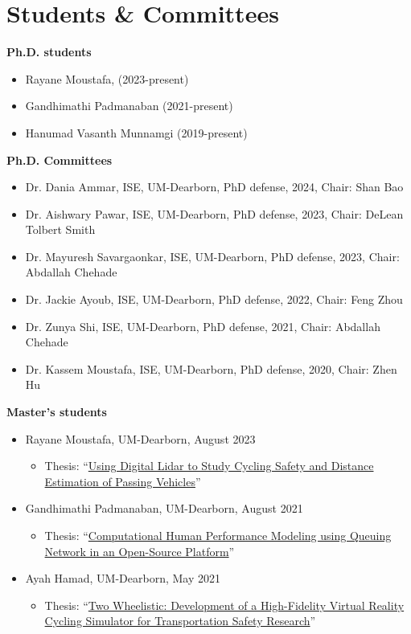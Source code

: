 \documentclass[11pt]{article}
\newenvironment{main}
{\begin{adjustwidth}{3em}{}}
{\end{adjustwidth}}
\begin{document}
\section*{Students \& Committees}
\begin{main}

\textbf{Ph.D. students}
\begin{itemize}
    \item Rayane Moustafa, (2023-present)
    \item Gandhimathi Padmanaban (2021-present)
    \item Hanumad Vasanth Munnamgi (2019-present)
\end{itemize}

\textbf{Ph.D. Committees}
\begin{itemize}
    \item Dr. Dania Ammar, ISE, UM-Dearborn, PhD defense, 2024, Chair: Shan Bao
    \item Dr. Aishwary Pawar, ISE, UM-Dearborn, PhD defense, 2023, Chair: DeLean Tolbert Smith
    \item Dr. Mayuresh Savargaonkar, ISE, UM-Dearborn, PhD defense, 2023, Chair: Abdallah Chehade
    \item Dr. Jackie Ayoub, ISE, UM-Dearborn, PhD defense, 2022, Chair: Feng Zhou
    \item Dr. Zunya Shi, ISE, UM-Dearborn, PhD defense, 2021, Chair: Abdallah Chehade
    \item Dr. Kassem Moustafa, ISE, UM-Dearborn, PhD defense, 2020, Chair: Zhen Hu
\end{itemize}

\textbf{Master's students}
\begin{itemize}
    \item Rayane Moustafa, UM-Dearborn, August 2023
        \begin{itemize}
            \item Thesis: ``\href{https://dx.doi.org/10.7302/8118}{Using Digital Lidar to Study Cycling Safety and Distance Estimation of Passing Vehicles}''
        \end{itemize} 
    \item Gandhimathi Padmanaban, UM-Dearborn, August 2021
        \begin{itemize}
            \item Thesis: ``\href{https://dx.doi.org/10.7302/2328}{Computational Human Performance Modeling using Queuing Network in an Open-Source Platform}''
        \end{itemize} 
    \item Ayah Hamad, UM-Dearborn, May 2021
        \begin{itemize}
            \item Thesis: ``\href{https://dx.doi.org/10.7302/1035}{Two Wheelistic: Development of a High-Fidelity Virtual Reality Cycling Simulator for Transportation Safety Research}''
        \end{itemize} 


\end{itemize}
\end{main}
\end{document}
